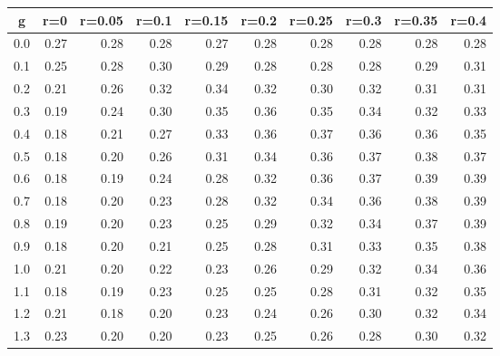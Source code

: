 %
\begin{table}[!tbp]
 \begin{center}
 \begin{tabular}{rrrrrrrrrr}\hline\hline
\multicolumn{1}{c}{g}&\multicolumn{1}{c}{r=0}&\multicolumn{1}{c}{r=0.05}&\multicolumn{1}{c}{r=0.1}&\multicolumn{1}{c}{r=0.15}&\multicolumn{1}{c}{r=0.2}&\multicolumn{1}{c}{r=0.25}&\multicolumn{1}{c}{r=0.3}&\multicolumn{1}{c}{r=0.35}&\multicolumn{1}{c}{r=0.4}\tabularnewline
\hline
0.0&0.27&0.28&0.28&0.27&0.28&0.28&0.28&0.28&0.28\tabularnewline
0.1&0.25&0.28&0.30&0.29&0.28&0.28&0.28&0.29&0.31\tabularnewline
0.2&0.21&0.26&0.32&0.34&0.32&0.30&0.32&0.31&0.31\tabularnewline
0.3&0.19&0.24&0.30&0.35&0.36&0.35&0.34&0.32&0.33\tabularnewline
0.4&0.18&0.21&0.27&0.33&0.36&0.37&0.36&0.36&0.35\tabularnewline
0.5&0.18&0.20&0.26&0.31&0.34&0.36&0.37&0.38&0.37\tabularnewline
0.6&0.18&0.19&0.24&0.28&0.32&0.36&0.37&0.39&0.39\tabularnewline
0.7&0.18&0.20&0.23&0.28&0.32&0.34&0.36&0.38&0.39\tabularnewline
0.8&0.19&0.20&0.23&0.25&0.29&0.32&0.34&0.37&0.39\tabularnewline
0.9&0.18&0.20&0.21&0.25&0.28&0.31&0.33&0.35&0.38\tabularnewline
1.0&0.21&0.20&0.22&0.23&0.26&0.29&0.32&0.34&0.36\tabularnewline
1.1&0.18&0.19&0.23&0.25&0.25&0.28&0.31&0.32&0.35\tabularnewline
1.2&0.21&0.18&0.20&0.23&0.24&0.26&0.30&0.32&0.34\tabularnewline
1.3&0.23&0.20&0.20&0.23&0.25&0.26&0.28&0.30&0.32\tabularnewline
\hline
\end{tabular}

\end{center}

\end{table}

